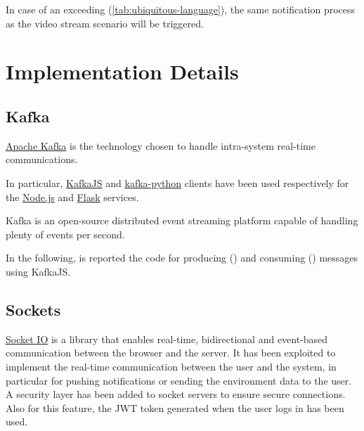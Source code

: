 \documentclass{scrartcl}
\begin{document}
    In case of an exceeding (\cref{tab:ubiquitous-language}), the same notification process as the video stream scenario will be triggered.

    \section{Implementation Details}

    \subsection{Kafka}

    \href{https://kafka.apache.org}{Apache Kafka} is the technology chosen to handle intra-system real-time communications.

    In particular, \href{https://kafka.js.org}{KafkaJS} and \href{https://kafka-python.readthedocs.io/en/master/}{kafka-python} clients
    have been used respectively for the \href{https://nodejs.org/en}{Node.js} and \href{https://flask.palletsprojects.com/en/3.0.x/}{Flask} services.

    Kafka is an open-source distributed event streaming platform capable of handling plenty of events per second.

    In the following, is reported the code for producing () and consuming () messages using KafkaJS.

    

    

    \subsection{Sockets}
    \href{https://socket.io/}{Socket IO} is a library that enables real-time, bidirectional and event-based communication between the browser and the server.
    It has been exploited to implement the real-time communication between the user and the system, in particular for pushing notifications or sending the environment data to the user.
    A security layer has been added to socket servers to ensure secure connections.
    Also for this feature, the JWT token generated when the user logs in has been used.
\end{document}
